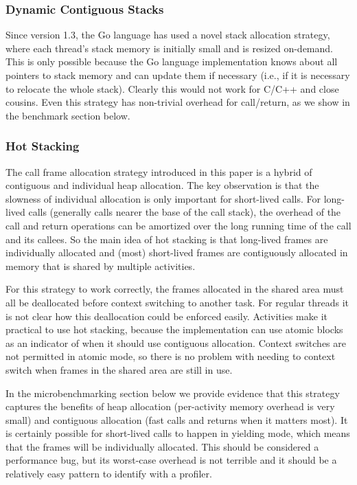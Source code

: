 \documentclass[9pt,preprint]{sigplanconf}
\begin{document}

\subsubsection{Dynamic Contiguous Stacks}

Since version 1.3, the Go language has used a novel stack allocation strategy, where each thread's stack memory is initially small and is resized on-demand.
This is only possible because the Go language implementation knows about all pointers to stack memory and can update them if necessary (i.e., if it is necessary to relocate the whole stack).
Clearly this would not work for C/C++ and close cousins.
Even this strategy has non-trivial overhead for call/return, as we show in the benchmark section below.

\subsubsection{Hot Stacking}

The call frame allocation strategy introduced in this paper is a hybrid of contiguous and individual heap allocation.
The key observation is that the slowness of individual allocation is only important for short-lived calls.
For long-lived calls (generally calls nearer the base of the call stack), the overhead of the call and return operations can be amortized over the long running time of the call and its callees.
So the main idea of hot stacking is that long-lived frames are individually allocated and (most) short-lived frames are contiguously allocated in memory that is shared by multiple activities.

For this strategy to work correctly, the frames allocated in the shared area must all be deallocated before context switching to another task.
For regular threads it is not clear how this deallocation could be enforced easily.
Activities make it practical to use hot stacking, because the implementation can use atomic blocks as an indicator of when it should use contiguous allocation.
Context switches are not permitted in atomic mode, so there is no problem with needing to context switch when frames in the shared area are still in use.

In the microbenchmarking section below we provide evidence that this strategy captures the benefits of heap allocation (per-activity memory overhead is very small) and contiguous allocation (fast calls and returns when it matters most).
It is certainly possible for short-lived calls to happen in yielding mode, which means that the frames will be individually allocated.
This should be considered a performance bug, but its worst-case overhead is not terrible and it should be a relatively easy pattern to identify with a profiler.
\end{document}
